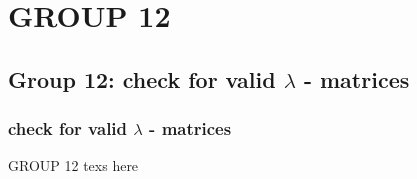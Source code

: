 
\section{GROUP 12}
\subsection{Group 12: check for valid $\lambda$ - matrices}
\begin{frame}
\frametitle{check for valid $\lambda$ - matrices}
GROUP 12 texs here
\end{frame}
